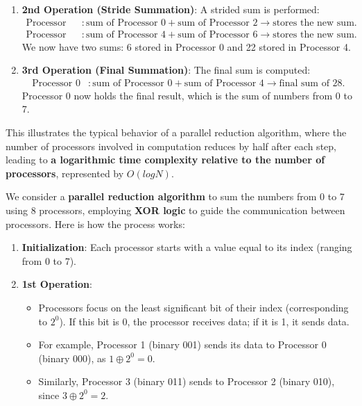 \documentclass{article}
\begin{document}
\begin{itemize}
\begin{enumerate}
    \item \textbf{2nd Operation (Stride Summation)}: A strided sum is performed:
    \begin{align*}
        \text{Processor 0} &: \text{sum of Processor 0} + \text{sum of Processor 2} \rightarrow \text{stores the new sum.} \\
        \text{Processor 4} &: \text{sum of Processor 4} + \text{sum of Processor 6} \rightarrow \text{stores the new sum.}
    \end{align*}
    We now have two sums: 6 stored in Processor 0 and 22 stored in Processor 4.
    
    \item \textbf{3rd Operation (Final Summation)}: The final sum is computed:
    \begin{align*}
        \text{Processor 0} &: \text{sum of Processor 0} + \text{sum of Processor 4} \rightarrow \text{final sum of 28.}
    \end{align*}
    Processor 0 now holds the final result, which is the sum of numbers from 0 to 7.
\end{enumerate}

This illustrates the typical behavior of a parallel reduction algorithm, where the number of processors involved in computation reduces by half after each step, leading to \textbf{a logarithmic time complexity relative to the number of processors}, represented by $O(logN)$.\par
We consider a \textbf{parallel reduction algorithm} to sum the numbers from 0 to 7 using 8 processors, employing \textbf{XOR logic} to guide the communication between processors. Here is how the process works:

\begin{enumerate}
    \item \textbf{Initialization}: Each processor starts with a value equal to its index (ranging from 0 to 7).

    \item \textbf{1st Operation}:
    \begin{itemize}
        \item Processors focus on the least significant bit of their index (corresponding to \(2^0\)). If this bit is 0, the processor receives data; if it is 1, it sends data.
        \item For example, Processor 1 (binary 001) sends its data to Processor 0 (binary 000), as \(1 \oplus 2^0 = 0\).
        \item Similarly, Processor 3 (binary 011) sends to Processor 2 (binary 010), since \(3 \oplus 2^0 = 2\).
    \end{itemize}


\end{enumerate}
\end{itemize}
\end{document}
